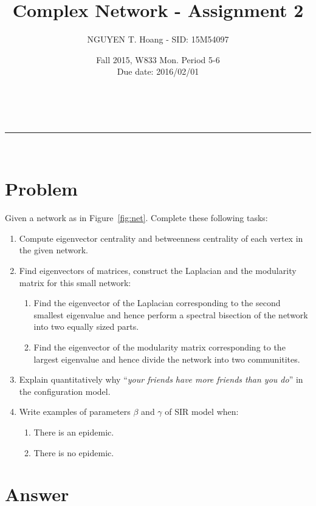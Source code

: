 \documentclass[a4paper,12pt]{article}
\makeatletter
\newcommand{\linia}{\rule{\linewidth}{0.5pt}}
\renewcommand{\maketitle} {%
\begin{center}
\vspace{2ex}
{\huge \textsc{\@title}}
\vspace{1ex}
\\
\linia\\
\@author \hfill \@date
\vspace{4ex}
\end{center}
}
\makeatother
\begin{document}

\title{Complex Network - Assignment 2}

\author{NGUYEN T. Hoang - SID: 15M54097}

\date{Fall 2015, W833 Mon. Period 5-6 \\ \hfill Due date: 2016/02/01}

\maketitle

\vspace{4em}
\section*{Problem}
\noindent
Given a network as in Figure~\ref{fig:net}. Complete these following tasks:
\begin{enumerate}
    \item Compute eigenvector centrality and betweenness centrality of each vertex in the given network.
    \item Find eigenvectors of matrices, construct the Laplacian and the modularity matrix for this small network:
    \begin{enumerate}
        \item Find the eigenvector of the Laplacian corresponding to the second smallest eigenvalue and hence perform a spectral bisection of the network into two equally sized parts.
        \item Find the eigenvector of the modularity matrix corresponding to the largest eigenvalue and hence divide the network into two communitites.
    \end{enumerate}
    \item Explain quantitatively why ``\emph{your friends have more friends than you do}'' in the configuration model.
    \item Write examples of parameters $\beta$ and $\gamma$ of SIR model when:
    \begin{enumerate}
        \item There is an epidemic.
        \item There is no epidemic.
    \end{enumerate}
\end{enumerate}
\pagebreak
\section*{Answer}
\end{document}
